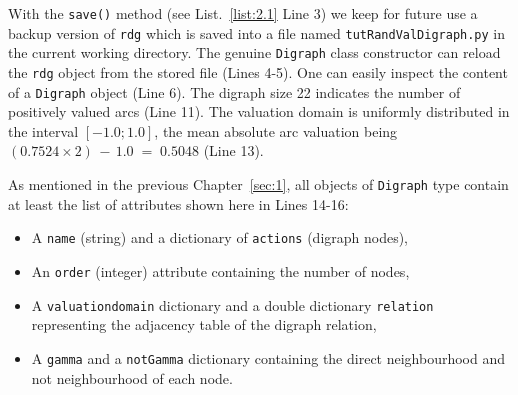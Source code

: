 With the \texttt{save()}  method (see List.~\vref{list:2.1} Line 3) we keep for future use a backup version of \texttt{rdg} which is saved into a file named \texttt{tutRandValDi\-graph.py} in the current working directory. The genuine \texttt{Di\-graph} class constructor can reload the \texttt{rdg} object from the stored file (Lines 4-5). One can easily inspect the content of a \texttt{Digraph} object (Line 6). The digraph size 22 indicates the number of positively valued arcs (Line 11). The valuation domain is uniformly distributed in the interval $[-1.0; 1.0]$, the mean absolute arc valuation being $(0.7524 \times 2)\, -\, 1.0 \;=\; 0.5048$ (Line 13). 

As mentioned in the previous Chapter~\ref{sec:1}, all objects of \texttt{Digraph} type contain at least the list of attributes shown here in Lines 14-16:
\begin{itemize}[nosep]
\item A \texttt{name} (string) and a dictionary of \texttt{actions} (digraph nodes),
\item An \texttt{order} (integer) attribute containing the number of nodes,
\item A \texttt{valuationdomain} dictionary and a double dictionary \texttt{relation} representing the adjacency table of the digraph relation,
\item A \texttt{gamma} and a {\tt notGamma} dictionary containing the direct neighbourhood and not neighbourhood of each node.
\end{itemize}


